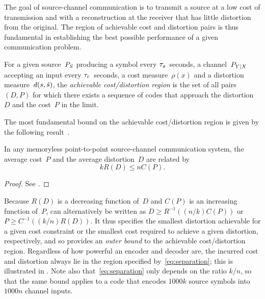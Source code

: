 The goal of source-channel communication is to transmit a source at a low cost
of transmission and with a reconstruction at the receiver that has little
distortion from the original. The region of achievable cost and distortion pairs
is thus fundamental in establishing the best possible performance of a given
communication problem.

\begin{definition}
  \label{def:achievableregion}
  For a given source~${P_S}$ producing a symbol every ${\tau_s}$~seconds, a
  channel~$P_{Y|X}$ accepting an input every ${\tau_c}$~seconds, a cost
  measure~$\rho(x)$ and a distortion measure~$d(s,{\hat{s}})$, the \emph{achievable
  cost\slash distortion region} is the set of all pairs $(D,P)$ for which there
  exists  a sequence of codes that approach the distortion~$D$ and the cost~$P$
  in the limit.
\end{definition}

The most fundamental bound on the achievable cost/distortion region is given by
the following result~\cite[Theorem~21]{Shannon1948}.

\begin{theorem}
  \label{thm:separationconverse}
  In any memoryless point-to-point source-channel communication system, the
  average cost~$P$ and the average distortion~$D$ are related by
  \begin{equation}
    \label{eq:separation}
    kR(D) \le nC(P).
  \end{equation}
\end{theorem}

\begin{proof}
  See .
\end{proof}

Because $R(D)$ is a decreasing function of~$D$ and $C(P)$ is an increasing
function of~$P$,  can alternatively be written as $D
\ge R^{-1}((n/k) C(P))$ or $P \ge C^{-1}((k/n) R(D))$.  It thus specifies the
smallest distortion achievable for a given cost constraint or the smallest cost
required to achieve a given distortion, respectively, and so provides an
\emph{outer bound} to the achievable cost/distortion region.  Regardless of how
powerful an encoder and decoder are, the incurred cost and distortion always lie
in the region specified by~\eqref{eq:separation}; this is illustrated in
. Note also that~\eqref{eq:separation} only depends on
the ratio $k/n$, so that the same bound applies to a code that encodes $1000k$
source symbols into $1000n$ channel inputs. 


